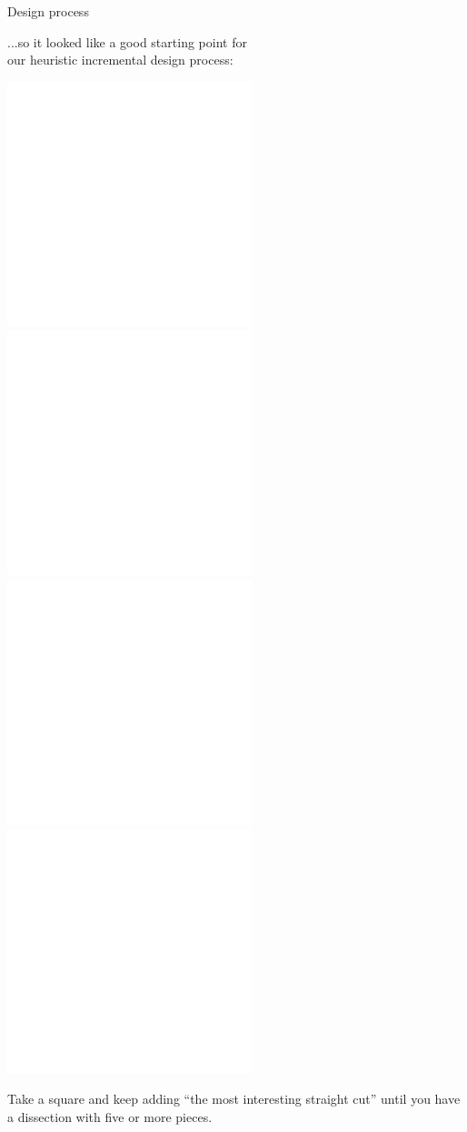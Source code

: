 \documentclass[14pt]{beamer}
\begin{document}
    \begin{frame}{Design process}
        \begin{center}
            ...so it looked like a good starting point for\\our heuristic incremental design process:

            \bigskip\bigskip

            \includegraphics[height=10ex]{figures/figure001e.pdf} \quad \includegraphics[height=10ex]{figures/figure001d.pdf} \quad \includegraphics[height=10ex]{figures/figure001c.pdf} \quad \includegraphics[height=10ex]{figures/figure001b.pdf} \\

            \bigskip\bigskip

            {\small Take a square and keep adding ``the most interesting straight cut'' until you have a dissection with five or more pieces.}
        \end{center}
    \end{frame}

\end{document}
